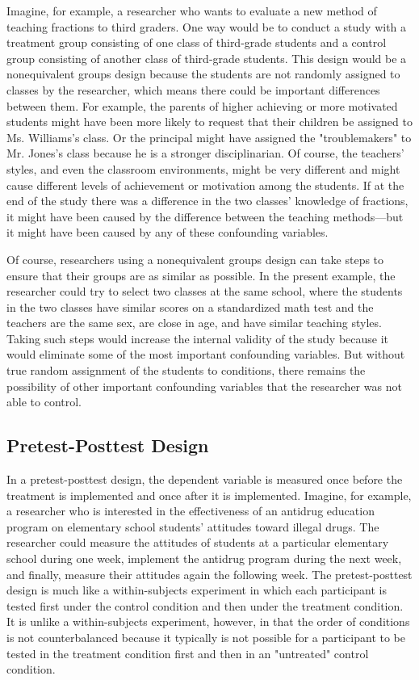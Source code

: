 Imagine, for example, a researcher who wants to evaluate a new method of teaching fractions to third graders. One way would be to conduct a study with a treatment group consisting of one class of third-grade students and a control group consisting of another class of third-grade students. This design would be a nonequivalent groups design because the students are not randomly assigned to classes by the researcher, which means there could be important differences between them. For example, the parents of higher achieving or more motivated students might have been more likely to request that their children be assigned to Ms. Williams's class. Or the principal might have assigned the "troublemakers" to Mr. Jones's class because he is a stronger disciplinarian. Of course, the teachers' styles, and even the classroom environments, might be very different and might cause different levels of achievement or motivation among the students. If at the end of the study there was a difference in the two classes' knowledge of fractions, it might have been caused by the difference between the teaching methods---but it might have been caused by any of these confounding variables.

Of course, researchers using a nonequivalent groups design can take steps to ensure that their groups are as similar as possible. In the present example, the researcher could try to select two classes at the same school, where the students in the two classes have similar scores on a standardized math test and the teachers are the same sex, are close in age, and have similar teaching styles. Taking such steps would increase the internal validity of the study because it would eliminate some of the most important confounding variables. But without true random assignment of the students to conditions, there remains the possibility of other important confounding variables that the researcher was not able to control.

\subsection{Pretest-Posttest Design}

In a pretest-posttest design, the dependent variable is measured once before the treatment is implemented and once after it is implemented. Imagine, for example, a researcher who is interested in the effectiveness of an antidrug education program on elementary school students' attitudes toward illegal drugs. The researcher could measure the attitudes of students at a particular elementary school during one week, implement the antidrug program during the next week, and finally, measure their attitudes again the following week. The pretest-posttest design is much like a within-subjects experiment in which each participant is tested first under the control condition and then under the treatment condition. It is unlike a within-subjects experiment, however, in that the order of conditions is not counterbalanced because it typically is not possible for a participant to be tested in the treatment condition first and then in an "untreated" control condition.

